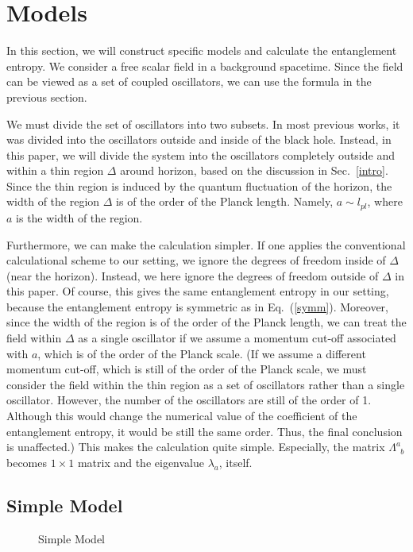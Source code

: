 \documentclass[12pt,epsf]{article}
\def\sp{\phantom{a}}
\begin{document}
\section{Models}
\label{model}
In this section, we will construct specific models and
calculate the entanglement entropy.
We consider a free scalar field in a background spacetime.
Since the field can be viewed as a set of coupled oscillators,
we can use the formula in the previous section.

We must divide the set of oscillators into two subsets.
In most previous works,
it was divided into the oscillators outside and
inside of the black hole.
Instead, in this paper, we will divide the system into 
the oscillators completely outside and
within a thin region $\Delta$ around horizon,
based on the discussion in Sec.~\ref{intro}.
Since the thin region
is induced by the quantum fluctuation of the horizon,
the width of the region $\Delta$ is of the order of
the Planck length.
Namely, $a\sim l_{pl}$, where $a$ is the width of the region.

Furthermore, we can make the calculation simpler.
If one applies the conventional calculational scheme
to our setting, we ignore the degrees of freedom
inside of $\Delta$ (near the horizon).
Instead, we here ignore the degrees of freedom
outside of $\Delta$ in this paper.
Of course, this gives the same entanglement entropy
in our setting, because the entanglement entropy is
symmetric as in Eq.~(\ref{symm}).
Moreover,
since the width of the region is of the order of
the Planck length,
we can treat the field within $\Delta$ as
a single oscillator
if we assume a momentum cut-off associated with $a$,
which is of the order of the Planck scale.
(If we assume a different momentum cut-off, which is still
of the order of the Planck scale,
we must consider the field within the thin region as
a set of oscillators rather than a single oscillator.
However,
the number of the oscillators are still of the order of 1.
Although this would change the numerical value
of the coefficient of the entanglement entropy,
it would be still the same order.
Thus, the final conclusion is unaffected.)
This makes the calculation quite simple.
Especially, the matrix $\Lambda^a_{\sp b}$ becomes
$1\times1$ matrix and the eigenvalue $\lambda_a$, itself.

\subsection{Simple Model}

\begin{figure}
\begin{center}
\leavevmode
\epsfysize=7cm
\caption{Simple Model}
\label{model1}
\end{center}
\end{figure}
\end{document}
